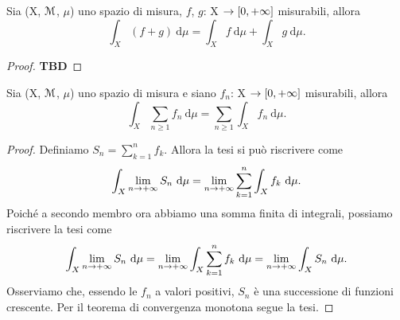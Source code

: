 \documentclass[Completo.tex]{subfiles}
\begin{document}
	\begin{Prop}
		Sia (X, $\eu[M]$, $\mu$) uno spazio di misura, $f$, $g$: X $\rightarrow [0, +\infty]$ misurabili, allora
		\begin{equation*}
		\int_X (f+g) \ \mathrm{d}\mu = \int_X f \ \mathrm{d}\mu + \int_X g \ \mathrm{d}\mu.
		\end{equation*}
	\end{Prop}
	\begin{proof}
		\textbf{TBD}
	\end{proof}
	\begin{eTh}
		Sia (X, $\eu[M]$, $\mu$) uno spazio di misura e siano $f_n$: X $\rightarrow [0, +\infty]$ misurabili, allora
		\begin{equation*}
		\int_X \sum_{n\geq 1} f_n \ \mathrm{d}\mu = \sum_{n\geq 1} \int_X f_n \ \mathrm{d}\mu.
		\end{equation*}
	\end{eTh}
	\begin{proof}
		Definiamo $S_n = \sum_{k=1}^{n} f_k$. Allora la tesi si può riscrivere come
		\begin{equation*}
		\int_X \lim_{n \rightarrow +\infty} S_n \ \mathrm{d}\mu = \lim_{n \rightarrow +\infty} \sum_{k=1}^{n} \int_X f_k \ \mathrm{d}\mu.
		\end{equation*}
		Poiché a secondo membro ora abbiamo una somma finita di integrali, possiamo riscrivere la tesi come
		\begin{equation*}
		\int_X \lim_{n \ra +\infty} S_n \ \mathrm{d}\mu = \lim_{n \ra +\infty} \int_X \sum_{k = 1}^{n} f_k \ \mathrm{d}\mu = \lim_{n \ra +\infty} \int_X S_n \ \mathrm{d}\mu.
		\end{equation*}
		Osserviamo che, essendo le $f_n$ a valori positivi, $S_n$ è una successione di funzioni crescente. Per il teorema di convergenza monotona segue la tesi.
	\end{proof}
	
\end{document}
